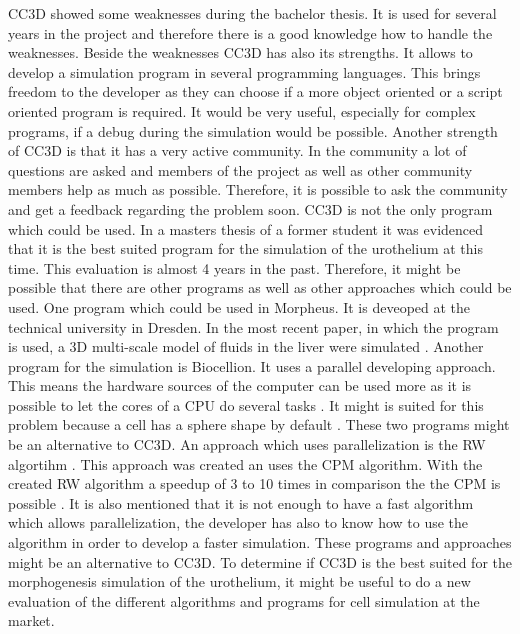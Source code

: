 \ac{CC3D} showed some weaknesses during the bachelor thesis. It is used for several years in the project and therefore there is a good knowledge how to handle the weaknesses. Beside the weaknesses \ac{CC3D} has also its strengths. It allows to develop a simulation program in several programming languages.  This brings freedom to the developer as they can choose if a more object oriented or a script oriented program is required. It would be very useful, especially for complex programs, if a debug during the simulation would be possible. Another strength of \ac{CC3D} is that it has a very active community. In the community a lot of questions are asked and members of the project as well as other community members help as much as possible. Therefore, it is possible to ask the community and get a feedback regarding the problem soon. \newline
\ac{CC3D} is not the only program which could be used. In a masters thesis of a former student it was evidenced that it is the best suited program for the simulation of the urothelium \cite{MSCAngelo} at this time. This evaluation is almost 4 years in the past. Therefore, it might be possible that there are other programs as well as other approaches which could be used. One program which could be used in Morpheus. It is deveoped at the technical university in Dresden. In the most recent paper, in which the program is used, a 3D multi-scale model of fluids in the liver were simulated \cite{Meyer2017}. Another program for the simulation is Biocellion. It uses a parallel developing approach. This means the hardware sources of the computer can be used more as it is possible to let the cores of a CPU do several tasks \cite{Kang2014}. It might is suited for this problem because a cell has a sphere shape by default \cite{Kang2014}. These two programs might be an alternative to \ac{CC3D}. \newline
An approach which uses parallelization is the \ac{RW} algortihm \cite{Cercato2006}. This approach was created an uses the \ac{CPM} algorithm. With the created \ac{RW} algorithm a speedup of 3 to 10 times in comparison the the \ac{CPM} is possible \cite{Cercato2006}. It is also mentioned that it is not enough to have a fast algorithm which allows parallelization, the developer has also to know how to use the algorithm in order to develop a faster simulation. \newline
These programs and approaches might be an alternative to \ac{CC3D}. To determine if \ac{CC3D} is the best suited for the morphogenesis simulation of the urothelium, it might be useful to do a new evaluation of the different algorithms and programs for cell simulation at the market.


